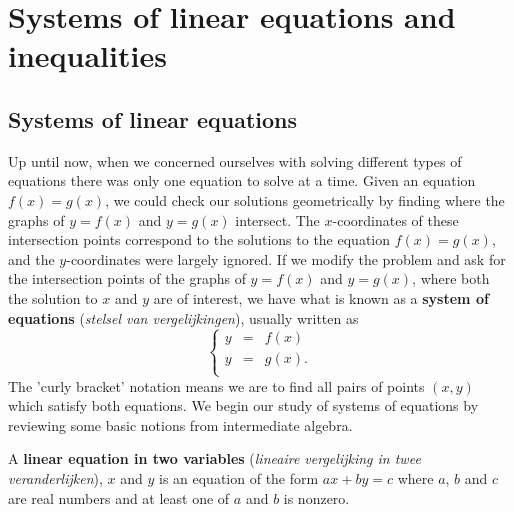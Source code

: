  
\chapter{Systems of linear equations and inequalities}
\label{chap_systems_lin_eq}
\graphicspath{{figures/Systems_lin_eq/}}

\setlength{\extrarowheight}{0pt}


\section{Systems of linear equations} \label{syst_lin_eq}

Up until now, when we concerned ourselves with solving different types of equations there was only one equation to solve at a time.  Given an equation $f(x) = g(x)$, we could check our solutions geometrically by finding where the graphs of $y=f(x)$ and $y=g(x)$ intersect. The $x$-coordinates of these intersection points correspond to the solutions to the equation $f(x) = g(x)$, and the $y$-coordinates were largely ignored.  If we modify the problem and ask for the intersection points of the graphs of $y=f(x)$ and $y=g(x)$, where both the solution to $x$ and $y$ are of interest, we have what is known as a  \textbf{system of equations} (\textit{stelsel van vergelijkingen}), usually written as
 \[ \left\{ \begin{array}{rcl} y & = & f(x) \\ y & = & g(x). \\ \end{array} \right.\]  
The 'curly bracket' notation means we are  to find all pairs of points $(x,y)$ which satisfy both equations.  We begin our study of systems of equations by reviewing some basic notions from intermediate algebra.

\smallskip


\begin{definition}
	\label{lineareqntwovariables}  A   \textbf{linear equation in two variables} (\textit{lineaire vergelijking in twee veranderlijken}), $x$ and $y$ is an equation of the form $a x + b y = c$ where $a$, $b$ and $c$ are real numbers and at least one of $a$ and $b$ is nonzero.
\end{definition}

\smallskip

